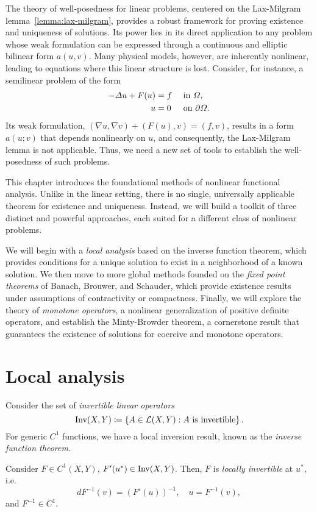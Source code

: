 The theory of well-posedness for linear problems, centered on the Lax-Milgram lemma~\ref{lemma:lax-milgram}, provides a robust framework for proving existence and uniqueness of solutions. Its power lies in its direct application to any problem whose weak formulation can be expressed through a continuous and elliptic bilinear form $a(u,v)$. Many physical models, however, are inherently nonlinear, leading to equations where this linear structure is lost. Consider, for instance, a semilinear problem of the form
\begin{equation}\label{eq:semilinear-example}
    \begin{aligned}
        -\Delta u + F(u) &= f &&\text{ in } \Omega,  \\
        u &= 0 && \text{ on } \partial\Omega.
    \end{aligned}
\end{equation}
Its weak formulation, $(\nabla u, \nabla v) + (F(u),v) = (f,v)$, results in a form $a(u;v)$ that depends nonlinearly on $u$, and consequently, the Lax-Milgram lemma is not applicable. Thus, we need a new set of tools to establish the well-posedness of such problems.

This chapter introduces the foundational methods of nonlinear functional analysis. Unlike in the linear setting, there is no single, universally applicable theorem for existence and uniqueness. Instead, we will build a toolkit of three distinct and powerful approaches, each suited for a different class of nonlinear problems.

We will begin with a \emph{local analysis} based on the inverse function theorem, which provides conditions for a unique solution to exist in a neighborhood of a known solution. We then move to more global methods founded on the \emph{fixed point theorems} of Banach, Brouwer, and Schauder, which provide existence results under assumptions of contractivity or compactness. Finally, we will explore the theory of \emph{monotone operators}, a nonlinear generalization of positive definite operators, and establish the Minty-Browder theorem, a cornerstone result that guarantees the existence of solutions for coercive and monotone operators.

\section{Local analysis}\label{sec:local-analysis}
Consider the set of \emph{invertible linear operators}
\begin{equation}
    \operatorname{\text{Inv}}(X,Y) \coloneqq \left\{ A\in \mathcal{L}(X,Y): A \text{ is invertible} \right\}.
\end{equation}
For generic $C^1$ functions, we have a local inversion result, known as the \emph{inverse function theorem}.
\begin{theorem}\label{thm:local-invertibility}
    Consider $F\in C^1(X,Y)$, $F'(u^*)\in\operatorname{\text{Inv}}(X,Y)$. Then, $F$ is \emph{locally invertible} at $u^*$, i.e.
    \begin{equation}
        dF^{-1}(v) = (F'(u))^{-1}, \quad u=F^{-1}(v),
    \end{equation}
    and $F^{-1}\in C^1$.
\end{theorem}

